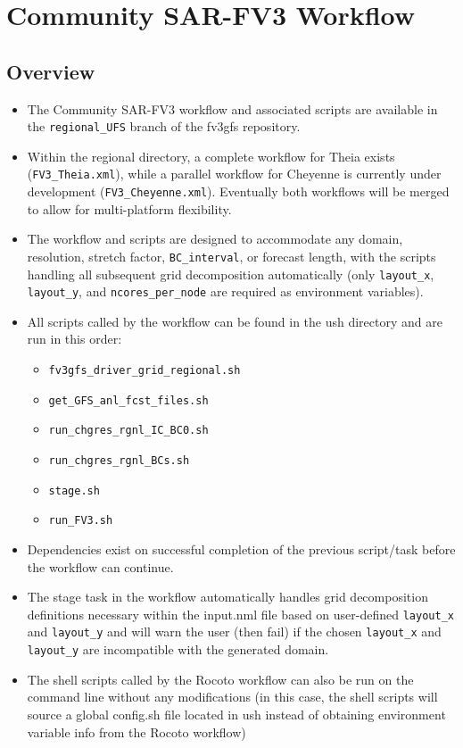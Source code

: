 \chapter{Community SAR-FV3 Workflow}
 
\section{Overview}
\begin{itemize}
\item The Community SAR-FV3 workflow and associated scripts are available in the \verb|regional_UFS| branch of the fv3gfs repository.
\item Within the regional directory, a complete workflow for Theia exists (\verb|FV3_Theia.xml|), while a parallel workflow for Cheyenne is currently under development (\verb|FV3_Cheyenne.xml|).  Eventually both workflows will be merged to allow for multi-platform flexibility.
\item The workflow and scripts are designed to accommodate any domain, resolution, stretch factor, \verb|BC_interval|, or forecast length, with the scripts handling all subsequent grid decomposition automatically (only \verb|layout_x|, \verb|layout_y|, and \verb|ncores_per_node| are required as environment variables).
\item All scripts called by the workflow can be found in the ush directory and are run in this order:
    \begin{itemize}
    \item \verb|fv3gfs_driver_grid_regional.sh|
    \item \verb|get_GFS_anl_fcst_files.sh|
    \item \verb|run_chgres_rgnl_IC_BC0.sh|
    \item \verb|run_chgres_rgnl_BCs.sh|
    \item \verb|stage.sh|
    \item \verb|run_FV3.sh|
    \end{itemize}
\item Dependencies exist on successful completion of the previous script/task before the workflow can continue.
\item The stage task in the workflow automatically handles grid decomposition definitions necessary within the input.nml file based on user-defined \verb|layout_x| and \verb|layout_y| and will warn the user (then fail) if the chosen \verb|layout_x| and \verb|layout_y| are incompatible with the generated domain.
\item The shell scripts called by the Rocoto workflow can also be run on the command line without any modifications (in this case, the shell scripts will source a global config.sh file located in ush instead of obtaining environment variable info from the Rocoto workflow)
\end{itemize}


